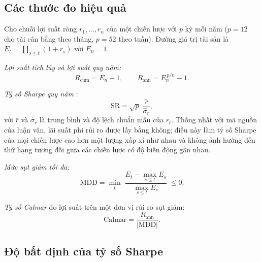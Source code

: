 \subsection{Các thước đo hiệu quả}
\label{sec:metrics}

Cho chuỗi lợi suất ròng $r_1,\dots,r_n$ của một chiến lược với $p$ kỳ mỗi năm ($p=12$ cho tái cân bằng theo tháng, $p=52$ theo tuần). Đường giá trị tài sản là $E_t=\prod_{s\le t}(1+r_s)$ với $E_0=1$.

\textit{Lợi suất tích lũy và lợi suất quy năm:}
\begin{equation}
R_{\mathrm{cum}}=E_n-1,\qquad R_{\mathrm{ann}}=E_n^{\,p/n}-1 .
\end{equation}

\textit{Tỷ số Sharpe quy năm} \cite{sharpe1966,sharpe1994}:
\begin{equation}
\mathrm{SR}=\sqrt{p}\;\frac{\bar r}{\hat\sigma_r},
\label{eq:sharpe}
\end{equation}
với $\bar r$ và $\hat\sigma_r$ là trung bình và độ lệch chuẩn mẫu của $r_t$. Thống nhất với mã nguồn của luận văn, lãi suất phi rủi ro được lấy bằng không; điều này làm tỷ số Sharpe của mọi chiến lược cao hơn một lượng xấp xỉ như nhau và không ảnh hưởng đến thứ hạng tương đối giữa các chiến lược có độ biến động gần nhau.

\textit{Mức sụt giảm tối đa:}
\begin{equation}
\mathrm{MDD}=\min_{t}\;\frac{E_t-\max_{s\le t}E_s}{\max_{s\le t}E_s}\;\le 0 .
\end{equation}

\textit{Tỷ số Calmar} \cite{young1991} đo lợi suất trên một đơn vị rủi ro sụt giảm:
\begin{equation}
\mathrm{Calmar}=\frac{R_{\mathrm{ann}}}{|\mathrm{MDD}|}.
\label{eq:calmar}
\end{equation}

\subsection{Độ bất định của tỷ số Sharpe}
\label{sec:sharpe-se}

